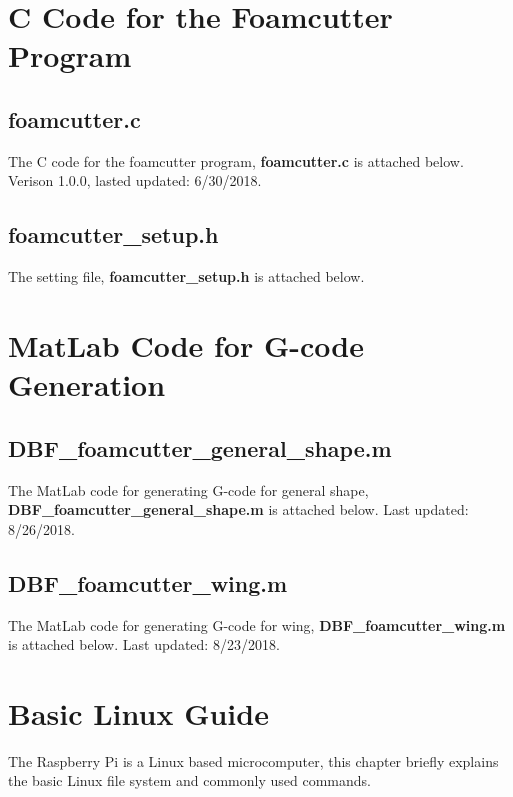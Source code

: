 \documentclass[titlepage,12pt,letter]{report}
\numberwithin{equation}{chapter}
\begin{document}
\newpage
\begin{appendices}
\chapter{C Code for the Foamcutter Program}
\section{foamcutter.c}
The C code for the foamcutter program, \textbf{foamcutter.c} is attached below. Verison 1.0.0, lasted updated: 6/30/2018.


\section{foamcutter\_setup.h}
The setting file, \textbf{foamcutter\_setup.h} is attached below. 


\chapter{MatLab Code for G-code Generation}
\section{DBF\_foamcutter\_general\_shape.m}
The MatLab code for generating G-code for general shape, \\ \textbf{DBF\_foamcutter\_general\_shape.m} is attached below. Last updated: 8/26/2018.


\section{DBF\_foamcutter\_wing.m}
The MatLab code for generating G-code for wing, \textbf{DBF\_foamcutter\_wing.m} is attached below. Last updated: 8/23/2018.


\chapter{Basic Linux Guide}
The Raspberry Pi is a Linux based microcomputer, this chapter briefly explains the basic Linux file system and commonly used commands.


\end{appendices}
\end{document}
